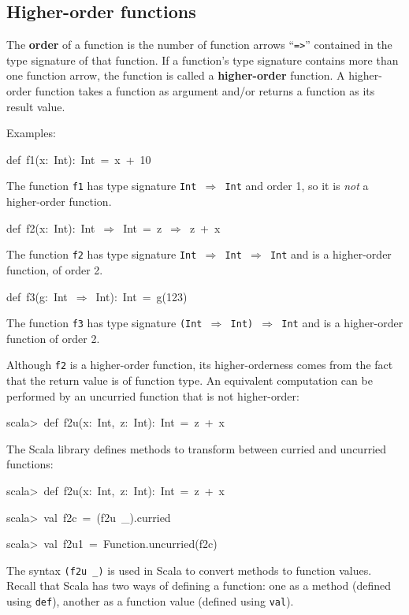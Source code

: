 \subsection{Higher-order functions}

The \textbf{order} of a function is the
number of function arrows ``\lstinline!=>!'' contained in the type
signature of that function. If a function's type signature contains
more than one function arrow, the function is called a \textbf{higher-order}
function. A higher-order function takes a function as argument and/or
returns a function as its result value.

Examples:
\begin{lyxcode}
def~f1(x:~Int):~Int~=~x~+~10
\end{lyxcode}
The function \texttt{f1} has type signature \texttt{Int $\Rightarrow$
Int} and order 1, so it is \emph{not} a higher-order function.
\begin{lyxcode}
def~f2(x:~Int):~Int~$\Rightarrow$~Int~=~z~$\Rightarrow$~z~+~x
\end{lyxcode}
The function \texttt{f2} has type signature \texttt{Int $\Rightarrow$
Int $\Rightarrow$ Int} and is a higher-order function, of order 2. 
\begin{lyxcode}
def~f3(g:~Int~$\Rightarrow$~Int):~Int~=~g(123)
\end{lyxcode}
The function \texttt{f3} has type signature \texttt{(Int $\Rightarrow$
Int) $\Rightarrow$ Int} and is a higher-order function of order 2.

Although \texttt{f2} is a higher-order function, its higher-orderness
comes from the fact that the return value is of function type. An
equivalent computation can be performed by an uncurried function that
is not higher-order:
\begin{lyxcode}
scala>~def~f2u(x:~Int,~z:~Int):~Int~=~z~+~x
\end{lyxcode}
The Scala library defines methods to transform between curried and
uncurried functions:
\begin{lyxcode}
scala>~def~f2u(x:~Int,~z:~Int):~Int~=~z~+~x

scala>~val~f2c~=~(f2u~\_).curried

scala>~val~f2u1~=~Function.uncurried(f2c)
\end{lyxcode}
The syntax \lstinline!(f2u _)! is used in Scala to convert methods
to function values. Recall that Scala has two ways of defining a function:
one as a method (defined using \lstinline!def!),
another as a function value (defined using
\lstinline!val!). 

